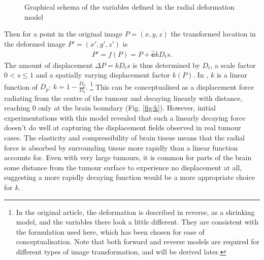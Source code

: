 \begin{figure}[htp]
  \centering
  
  \caption[Tumour deformation model variables]{Graphical schema of the variables defined in the radial deformation model}
  \label{fig:virtue}
\end{figure}

Then for a point in the original image $P = (x,y,z)$ the transformed location in the deformed image $P' = (x',y',z')$ is
\begin{align}\label{eq:forwardP}
  P' = f(P) = P + \mathbf{\hat{e}}kD_ts.
\end{align}
The amount of displacement $\Delta P = kD_ts$ is thus determined by $D_t$, a scale factor $0<s \leq 1$ and a spatially varying displacement factor $k(P)$.
In \textcite{Nowinski2005}, $k$ is a linear function of $D_p$: $k = 1-\frac{D_p}{D_b}$. \footnote[2]{In the original \textcite{Nowinski2005} article, the deformation is described in reverse, as a shrinking model, and the variables there look a little different. They are consistent with the formulation used here, which has been chosen for ease of conceptualisation. Note that both forward and reverse models are required for different types of image transformation, and will be derived later.}
This can be conceptualised as a displacement force radiating from the centre of the tumour and decaying linearly with distance, reaching 0 only at the brain boundary (Fig. \ref{fig:k}).
However, initial experimentations with this model revealed that such a linearly decaying force doesn't do well at capturing the displacement fields observed in real tumour cases.
The elasticity and compressibility of brain tissue means that the radial force is absorbed by surrounding tissue more rapidly than a linear function accounts for.
Even with very large tumours, it is common for parts of the brain some distance from the tumour surface to experience no displacement at all, suggesting a  more rapidly decaying function would be a more appropriate choice for $k$.

